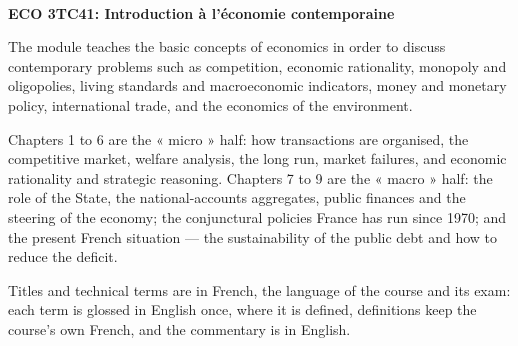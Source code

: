 \documentclass[10pt]{article}
\begin{document}
\thispagestyle{empty}
\bigskip \
\vspace{0.1cm}

\begin{center}
{\fontsize{30}{36} \selectfont \bf \sffamily ECO 3TC41: Introduction à l'économie contemporaine \par}
\vspace{24pt}
\end{center}

{\parindent0pt \baselineskip=15.5pt
  The module teaches the basic concepts of economics in order to discuss
  contemporary problems such as competition, economic rationality, monopoly and
  oligopolies, living standards and macroeconomic indicators, money and monetary
  policy, international trade, and the economics of the environment.

  \medskip
  Chapters 1 to 6 are the « micro » half: how transactions are organised, the
  competitive market, welfare analysis, the long run, market failures, and economic
  rationality and strategic reasoning. Chapters 7 to 9 are the « macro » half: the
  role of the State, the national-accounts aggregates, public finances and the
  steering of the economy; the conjunctural policies France has run since 1970; and
  the present French situation --- the sustainability of the public debt and how to
  reduce the deficit.

  \medskip
  Titles and technical terms are in French, the language of the course and its exam:
  each term is glossed in English once, where it is defined, definitions keep the
  course's own French, and the commentary is in English.
}

\microtoc%
\newpage










\end{document}

